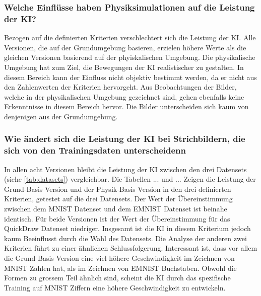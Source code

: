 \subsubsection*{Welche Einflüsse haben Physiksimulationen auf die Leistung der KI?}
\label{subsub:d_frage_unter_4}
Bezogen auf die definierten Kriterien verschlechtert sich die Leistung der KI.
Alle Versionen, die auf der Grundumgebung basieren, erzielen höhere Werte als
die gleichen Versionen basierend auf der phyiskalischen Umgebung. Die
physikalische Umgebung hat zum Ziel, die Bewegungen der KI realistischer zu
gestalten. In diesem Bereich kann der Einfluss nicht objektiv bestimmt werden,
da er nicht aus den Zahlenwerten der Kriterien hervorgeht. Aus Beobachtungen der
Bilder, welche in der physikalischen Umgebung gezeichnet sind, gehen ebenfalls
keine Erkenntnisse in diesem Bereich hervor. Die Bilder unterscheiden sich kaum
von denjenigen aus der Grundumgebung.

\subsubsection*{Wie ändert sich die Leistung der KI bei Strichbildern, die sich von den Trainingsdaten unterscheidenn}
\label{subsub:d_frage_unter_5}
In allen acht Versionen bleibt die Leistung der KI zwischen den drei Datensets
(siehe \autoref{tab:datasets}) vergleichbar. Die Tabellen {...} und {...} Zeigen
die Leistung der Grund-Basis Version und der Physik-Basis Version in den drei
definierten Kriterien, getestet auf die drei Datensets. Der Wert der
Übereinstimmung zwischen dem MNIST Datenset und dem EMNIST Datenset ist beinahe
identisch. Für beide Versionen ist der Wert der Übereinstimmung für das
QuickDraw Datenset niedriger. Insgesamt ist die KI in diesem Kriterium jedoch
kaum Beeinflusst durch die Wahl des Datensets. Die Analyse der anderen zwei
Kriterien führt zu einer ähnlichen Schlussfolgerung. Interessant ist, dass vor
allem die Grund-Basis Version eine viel höhere Geschwindigkeit im Zeichnen von
MNIST Zahlen hat, als im Zeichnen von EMNIST Buchstaben. Obwohl die Formen zu
grossem Teil ähnlich sind, scheint die KI durch das spezifische Training auf
MNIST Ziffern eine höhere Geschwindigkeit zu entwickeln. 



